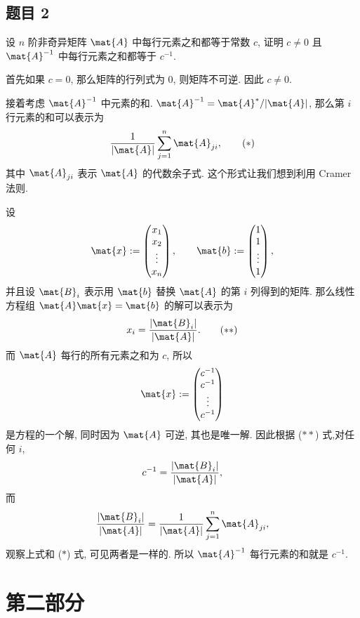 \subsection*{题目 2}
\begin{problem*}
设 $n$ 阶非奇异矩阵 $\mat{A}$ 中每行元素之和都等于常数 $c$, 证明 $c \not= 0$ 且 $\mat{A}^{-1}$ 中每行元素之和都等于 $c^{-1}$.
\end{problem*}
\begin{solution}
首先如果 $c = 0$, 那么矩阵的行列式为 $0$, 则矩阵不可逆. 因此 $c \not= 0$.

接着考虑 $\mat{A}^{-1}$ 中元素的和. $\mat{A}^{-1} = \mat{A}^{\ast} / |\mat{A}|$, 那么第 $i$ 行元素的和可以表示为
\[
\dfrac{1}{|\mat{A}|}\sum_{j = 1}^{n} \mat{A}_{ji}, \tag{$\ast$}
\]
其中 $\mat{A}_{ji}$ 表示 $\mat{A}$ 的代数余子式. 这个形式让我们想到利用 Cramer 法则.

设
\[
\mat{x} := 
\begin{pmatrix}
    x_1 \\
    x_2 \\
    \vdots \\
    x_n
\end{pmatrix}
, \qquad
\mat{b} :=
\begin{pmatrix}
    1 \\
    1 \\
    \vdots \\
    1
\end{pmatrix},
\]
并且设 $\mat{B}_i$ 表示用 $\mat{b}$ 替换 $\mat{A}$ 的第 $i$ 列得到的矩阵. 那么线性方程组 $\mat{A}\mat{x} = \mat{b}$ 的解可以表示为 
\[
x_i = \dfrac{|\mat{B}_i|}{|\mat{A}|}. \tag{$\ast\ast$}
\]
而 $\mat{A}$ 每行的所有元素之和为 $c$, 所以
\[
\mat{x} := 
\begin{pmatrix}
    c^{-1} \\
    c^{-1} \\
    \vdots \\
    c^{-1}
\end{pmatrix}
\]
是方程的一个解, 同时因为 $\mat{A}$ 可逆, 其也是唯一解. 因此根据 ($\ast\ast$) 式,对任何 $i$,
\[
    c^{-1} = \dfrac{|\mat{B}_i|}{|\mat{A}|},
\]
而
\[
    \dfrac{|\mat{B}_i|}{|\mat{A}|} = \dfrac{1}{|\mat{A}|}\sum_{j = 1}^{n}\mat{A}_{ji},
\]
观察上式和 ($\ast$) 式, 可见两者是一样的. 所以 $\mat{A}^{-1}$ 每行元素的和就是 $c^{-1}$.
\end{solution}

\newpage
\section{第二部分}
